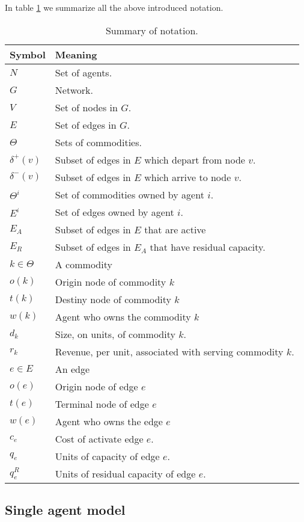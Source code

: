\documentclass{article}
\begin{document}
In table \ref{tb:notation} we summarize all the above introduced notation.

\begin{table}[ht!]
	\caption{Summary of notation. \label{tb:notation}}
	\begin{tabular}{|l|l|}
	\hline
	Symbol & Meaning	 \\ \hline
	$N$ & Set of agents. \\
	$G$ & Network. \\
	$V$ & Set of nodes in $G$. \\
	$E$ & Set of edges in $G$. \\
	$\Theta$ & Sets of commodities. \\
	$\delta^+(v)$ & Subset of edges in $E$ which depart from node $v$.\\
	$\delta^-(v)$ & Subset of edges in $E$ which arrive to node $v$.\\	
	$\Theta^i$ & Set of commodities owned by agent $i$. \\	
	$E^i$ & Set of edges owned by agent $i$.\\
	$E_A$ & Subset of edges in $E$ that are active \\
	$E_R$ & Subset of edges in $E_A$ that have residual capacity.\\
	$k \in \Theta$ & A commodity\\
	$o(k)$ & Origin node of commodity $k$\\
	$t(k)$ & Destiny node of commodity $k$\\
	$w(k)$ & Agent who owns the commodity $k$\\
	$d_k$ & Size, on units, of commodity $k$.\\
	$r_k$ & Revenue, per unit, associated with serving commodity $k$.\\
	$e\in E$ & An edge\\
	$o(e)$ & Origin node of edge $e$\\
	$t(e)$ & Terminal node of edge $e$\\
	$w(e)$ & Agent who owns the edge $e$\\
	$c_e$ & Cost of activate edge $e$. \\
	$q_e$ & Units of capacity of edge $e$. \\
	$q_e^R$ & Units of residual capacity of edge $e$.\\
	\hline
	\end{tabular}
\end{table}

\subsection{Single agent model}
\end{document}
